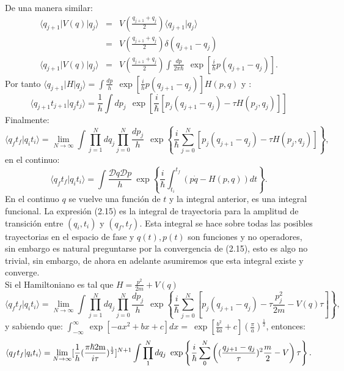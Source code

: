 De una manera similar:
\begin{eqnarray}
\nonumber \langle q_{j+1}|V(q)|q_j \rangle &=& V(\frac{q_{j+1}+q_j}{2})\langle q_{j+1}|q_j\rangle\\
\nonumber &=& V(\frac{q_{j+1}+q_j}{2})\delta(q_{j+1}-q_j)\\
\langle q_{j+1}|V(q)|q_j \rangle &=& V(\frac{q_{j+1}+q_j}{2})\int \frac{dp}{2\pi\hbar}\ \ \exp[\frac{i}{\hbar}p(q_{j+1}-q_j)].
\end{eqnarray}
Por tanto $\langle q_{j+1}|H|q_j\rangle=\int \frac{dp}{h}\ \ \exp[\frac{i}{h}p(q_{j+1}-q_j)]H(p,q)$ y :
\begin{equation}
\langle q_{j+1}t_{j+1}|q_jt_j\rangle=\frac{1}{h}\int dp_j\ \ \exp[\frac{i}{\hbar}[p_j(q_{j+1}-q_j)-\tau H(p_j,q_j)]]
\end{equation}
Finalmente:
\begin{equation}
\langle q_{f}t_{f}|q_it_i\rangle=\lim_{N \to \infty}\int\prod_{j=1}^{N}dq_j\prod_{j=0}^{N}\frac{dp_j}{h}\ \ \exp\left\{ \frac{i}{\hbar}\sum_{j=0}^{N}[p_{j}(q_{j+1}-q_{j})-\tau H(p_{j},q_{j})]\right\} ,
\end{equation}
en el continuo:
\begin{equation}
\langle q_{f}t_{f}|q_it_i\rangle=\int\frac{\mathcal{D}q\mathcal{D}p}{h}\ \exp\left\{ \frac{i}{\hbar}\int_{t_{i}}^{t_{f}}(p\dot{q}-H(p,q))dt\right\} . 
\end{equation}
En el continuo $q$ se vuelve una función de $t$ y la integral anterior, es una integral funcional. La expresión (2.15) es la integral de trayectoria para la amplitud de transición entre $(q_i,t_i)$ y $(q_f,t_f)$. Esta integral se hace sobre todas las posibles trayectorias en el espacio de fase y $q(t), p(t)$ son funciones y no operadores, sin embargo es natural preguntarse por la convergencia de (2.15), esto es algo no trivial, sin embargo, de ahora en adelante asumiremos que esta integral existe y converge. 	
\\
Si el Hamiltoniano es tal que $H=\frac{p^2}{2m}+V(q)$
\begin{equation}
\langle q_{f}t_{f}|q_it_i\rangle=\lim_{N \to \infty}\int\prod_{j=1}^{N}dq_j\prod_{j=0}^{N}\frac{dp_j}{h}\ \ \exp\left\{ \frac{i}{\hbar}\sum_{j=0}^{N}[p_{j}(q_{j+1}-q_{j})-\tau \frac{p_j^2}{2m}-V(q)\tau]\right\} ,
\end{equation}
y sabiendo que: $\int_{-\infty}^{\infty}\ \exp[-ax^{2}+bx+c]dx=\ \exp[\frac{b^{2}}{4a}+c](\frac{\pi}{a})^{\frac{1}{2}}$, entonces:
\begin{equation}
\langle q_{f}t_{f}|q_it_i\rangle=\lim_{N\to\infty}[\frac{1}{h}(\frac{\text{\ensuremath{\pi\hbar}2m}}{i\tau})^{\frac{1}{2}}]^{N+1}\int\prod_{1}^{N}dq_{j}\ \exp\left\{ \frac{i}{\hbar}\sum_{0}^{N}\left((\frac{q_{j+1}-q_{j}}{\tau})^{2}\frac{m}{2}-V\right)\tau\right\}. 
\end{equation}
